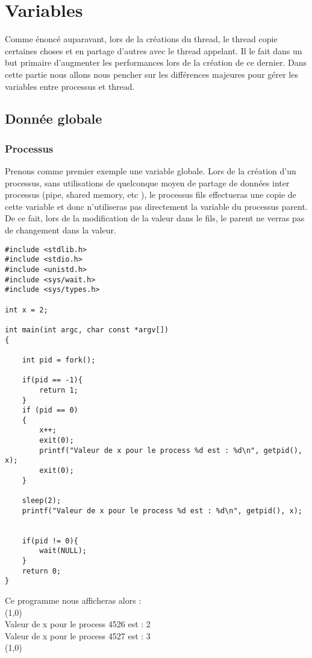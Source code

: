 \section{Variables}
Comme énoncé auparavant, lors de la créations du thread, le thread copie certaines choses et en partage d'autres avec le thread appelant. Il le fait dans un but primaire d'augmenter les performances lors de la création de ce dernier. Dans cette partie nous allons nous pencher sur les différences majeures pour gérer les variables entre processus et thread. 

\subsection{Donnée globale}
\subsubsection{Processus}
Prenons comme premier exemple une variable globale. Lors de la création d'un processus, sans utilisations de quelconque moyen de partage de données inter processus (pipe, shared memory, etc ), le processus fils effectueras une copie de cette variable et donc n'utiliseras pas directement la variable du processus parent. De ce fait, lors de la modification de la valeur dans le fils, le parent ne verras pas de changement dans la valeur. 

\begin{lstlisting}[title = Variable globale processus]
#include <stdlib.h>
#include <stdio.h>
#include <unistd.h>
#include <sys/wait.h>
#include <sys/types.h>

int x = 2;

int main(int argc, char const *argv[])
{

	int pid = fork();

	if(pid == -1){
		return 1;
	}
	if (pid == 0)
	{
		x++;
        exit(0);
        printf("Valeur de x pour le process %d est : %d\n", getpid(), x);
        exit(0);
	}

	sleep(2);
	printf("Valeur de x pour le process %d est : %d\n", getpid(), x);


	if(pid != 0){
		wait(NULL);
	}
	return 0;
}
\end{lstlisting}
\vspace{\baselineskip}


Ce programme nous afficheras alors : 
\\
\line(1,0){\linewidth}
\\
Valeur de x pour le process 4526 est : 2\\
Valeur de x pour le process 4527 est : 3
\\
\line(1,0){\linewidth}

